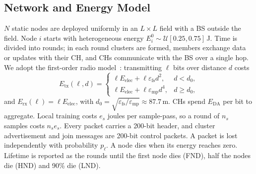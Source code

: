 \documentclass[journal]{IEEEtran}
\begin{document}
\subsection{Network and Energy Model}
$N$ static nodes are deployed uniformly in an $L\times L$ field with a BS outside the field. Node $i$ starts with heterogeneous energy $E_i^0\sim\mathcal{U}[0.25,0.75]$\,J. Time is divided into rounds; in each round clusters are formed, members exchange data or updates with their CH, and CHs communicate with the BS over a single hop. We adopt the first-order radio model~\cite{heinzelman2002}: transmitting $\ell$ bits over distance $d$ costs
\begin{equation}
E_{\mathrm{tx}}(\ell,d)=\begin{cases}\ell E_{\mathrm{elec}}+\ell\varepsilon_{\mathrm{fs}}d^{2}, & d<d_0,\\ \ell E_{\mathrm{elec}}+\ell\varepsilon_{\mathrm{mp}}d^{4}, & d\ge d_0,\end{cases}
\end{equation}
and $E_{\mathrm{rx}}(\ell)=\ell E_{\mathrm{elec}}$,
with $d_0=\sqrt{\varepsilon_{\mathrm{fs}}/\varepsilon_{\mathrm{mp}}}\approx 87.7$\,m. CHs spend $E_{\mathrm{DA}}$ per bit to aggregate. Local training costs $e_s$ joules per sample-pass, so a round of $n_s$ samples costs $n_se_s$. Every packet carries a 200-bit header, and cluster advertisement and join messages are 200-bit control packets. A packet is lost independently with probability $p_\ell$. A node dies when its energy reaches zero. Lifetime is reported as the rounds until the first node dies (FND), half the nodes die (HND) and 90\% die (LND).
\end{document}
